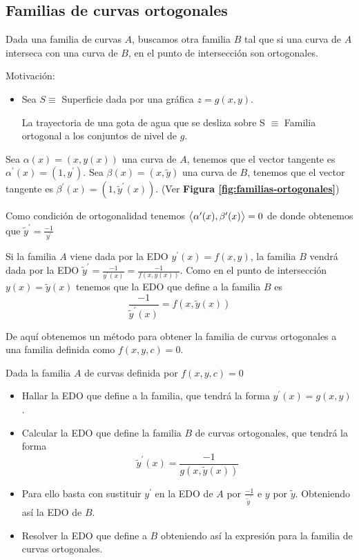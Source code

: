 \subsection{Familias de curvas ortogonales}
Dada una familia de curvas $A$, buscamos otra familia $B$ tal que si una curva de $A$ interseca con una curva de $B$, en el punto de intersección son ortogonales.

Motivación:
\begin{itemize}
\item Sea $S\equiv$ Superficie dada por una gráfica $z=g(x,y)$. 

La trayectoria de una gota de agua que se desliza sobre S $\equiv$ Familia ortogonal a los conjuntos de nivel de $g$.
\end{itemize}


Sea $\alpha(x) = (x, y(x))$ una curva de $A$, tenemos que el vector tangente es $\alpha^\prime(x) = (1, y^\prime)$. Sea $\beta(x) = (x, \tilde{y})$ una curva de $B$, tenemos que el vector tangente es $\beta^\prime(x) = (1, \tilde{y}^\prime(x))$. (Ver \textbf{Figura \ref{fig:familias-ortogonales}})

Como condición de ortogonalidad tenemos $\left\langle \alpha^\prime(x),\beta^\prime(x)\right\rangle=0$ de donde obtenemos que $\tilde{y}^\prime = \frac{-1}{y^\prime}$

Si la familia $A$ viene dada por la EDO $y^\prime(x) = f(x,y)$, la familia $B$ vendrá dada por la EDO $\tilde{y}^\prime = \frac{-1}{y^\prime(x)} = \frac{-1}{f(x,y(x))}$. Como en el punto de intersección $y(x) = \tilde{y}(x)$ tenemos que la EDO que define a la familia $B$ es $$\frac{-1}{\tilde{y}^\prime(x)} = f(x, \tilde{y}(x))$$

De aquí obtenemos un método para obtener la familia de curvas ortogonales a una familia definida como $f(x,y,c) = 0$.

\begin{method}
Dada la familia $A$ de curvas definida por $f(x,y,c) = 0$
\begin{itemize}
\item Hallar la EDO que define a la familia, que tendrá la forma $y^\prime(x) = g(x,y)$.
\item Calcular la EDO que define la familia $B$ de curvas ortogonales, que tendrá la forma $$\tilde{y}^\prime(x) = \frac{-1}{g(x, \tilde{y}(x))}$$
\item Para ello basta con sustituir $y^\prime$ en la EDO de $A$ por $\frac{-1}{\tilde{y}^\prime}$ e $y$ por $\tilde{y}$. Obteniendo así la EDO de $B$.
\item Resolver la EDO que define a $B$ obteniendo así la expresión para la familia de curvas ortogonales.
\end{itemize}
\end{method}

